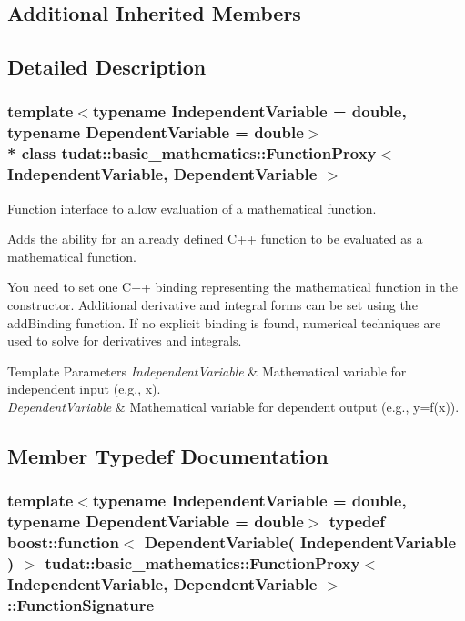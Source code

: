 \subsection*{Additional Inherited Members}


\subsection{Detailed Description}
\subsubsection*{template$<$typename Independent\+Variable = double, typename Dependent\+Variable = double$>$\\*
class tudat\+::basic\+\_\+mathematics\+::\+Function\+Proxy$<$ Independent\+Variable, Dependent\+Variable $>$}

\hyperlink{classtudat_1_1basic__mathematics_1_1Function}{Function} interface to allow evaluation of a mathematical function. 

Adds the ability for an already defined C++ function to be evaluated as a mathematical function.

You need to set one C++ binding representing the mathematical function in the constructor. Additional derivative and integral forms can be set using the add\+Binding function. If no explicit binding is found, numerical techniques are used to solve for derivatives and integrals. 
\begin{DoxyTemplParams}{Template Parameters}
{\em Independent\+Variable} & Mathematical variable for independent input (e.\+g., x). \\
\hline
{\em Dependent\+Variable} & Mathematical variable for dependent output (e.\+g., y=f(x)). \\
\hline
\end{DoxyTemplParams}


\subsection{Member Typedef Documentation}
\subsubsection[{\texorpdfstring{Function\+Signature}{FunctionSignature}}]{\setlength{\rightskip}{0pt plus 5cm}template$<$typename Independent\+Variable  = double, typename Dependent\+Variable  = double$>$ typedef boost\+::function$<$ Dependent\+Variable( Independent\+Variable ) $>$ {\bf tudat\+::basic\+\_\+mathematics\+::\+Function\+Proxy}$<$ Independent\+Variable, Dependent\+Variable $>$\+::{\bf Function\+Signature}}\hypertarget{classtudat_1_1basic__mathematics_1_1FunctionProxy_a1861c20597dcc1cbce1e7c455f2d82a9}{}\label{classtudat_1_1basic__mathematics_1_1FunctionProxy_a1861c20597dcc1cbce1e7c455f2d82a9}


